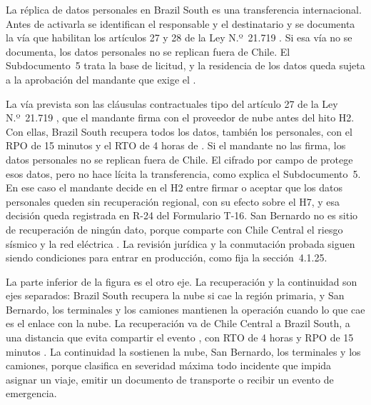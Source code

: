 La réplica de datos personales en Brazil South es una transferencia internacional. Antes de activarla
se identifican el responsable y el destinatario y se documenta la vía que habilitan los artículos 27 y
28 de la Ley N.º~21.719 \parencite{ley21719}. Si esa vía no se documenta, los datos personales no se
replican fuera de Chile. El Subdocumento~5 trata la base de licitud, y la residencia de los datos queda
sujeta a la aprobación del mandante que exige el .

La vía prevista son las cláusulas contractuales tipo del artículo 27 de la Ley N.º~21.719
\parencite{ley21719}, que el mandante firma con el proveedor de nube antes del hito H2. Con ellas,
Brazil South recupera todos los datos, también los personales, con el RPO de 15 minutos y el RTO de 4
horas de . Si el mandante no las firma, los datos personales no se replican fuera
de Chile. El cifrado por campo de  protege esos datos, pero no hace lícita la
transferencia, como explica el Subdocumento~5. En ese caso el mandante decide en el H2 entre firmar o
aceptar que los datos personales queden sin recuperación regional, con su efecto sobre el H7, y esa
decisión queda registrada en R-24 del Formulario T-16. San Bernardo no es sitio de recuperación de ningún
dato, porque comparte con Chile Central el riesgo sísmico y la red eléctrica . La
revisión jurídica y la conmutación probada siguen siendo condiciones para entrar en producción, como fija
la sección~4.1.25.

La parte inferior de la figura es el otro eje. La recuperación y la continuidad son ejes separados:
Brazil South recupera la nube si cae la región primaria, y San Bernardo, los terminales y los camiones
mantienen la operación cuando lo que cae es el enlace con la nube. La recuperación va de Chile Central a Brazil South, a una distancia que evita
compartir el evento , con RTO de 4 horas y RPO de 15 minutos
. La continuidad la sostienen la nube, San Bernardo, los terminales y los
camiones, porque  clasifica en severidad máxima todo incidente que impida asignar un
viaje, emitir un documento de transporte o recibir un evento de emergencia.

